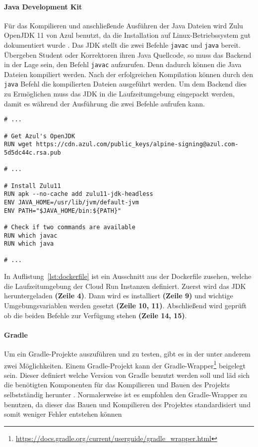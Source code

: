 \paragraph{Java Development Kit} Für das Kompilieren und anschließende Ausführen der Java Dateien wird
Zulu OpenJDK 11 von Azul benutzt, da die Installation auf
Linux-Betriebssystem gut dokumentiert wurde \cite{AzulZuluJDK}.
Das JDK stellt die zwei Befehle \texttt{javac} und \texttt{java} bereit.
Übergeben Student oder Korrektoren ihren Java Quellcode, so muss das Backend in der Lage
sein, den Befehl \texttt{javac} aufzurufen. Denn dadurch können die Java Dateien kompiliert werden.
Nach der erfolgreichen Kompilation können durch den \texttt{java} Befehl die kompilierten Dateien
ausgeführt werden.
Um dem Backend dies zu Ermöglichen muss das JDK in die Laufzeitumgebung eingepackt werden,
damit es während der Ausführung die zwei Befehle aufrufen kann.\\

\begin{lstlisting}[caption={Ausschnitt aus der Dockerfile mit JDK}, label={lst:dockerfile}]
# ... 

# Get Azul's OpenJDK
RUN wget https://cdn.azul.com/public_keys/alpine-signing@azul.com-5d5dc44c.rsa.pub

# ...

# Install Zulu11
RUN apk --no-cache add zulu11-jdk-headless
ENV JAVA_HOME=/usr/lib/jvm/default-jvm
ENV PATH="$JAVA_HOME/bin:${PATH}"

# Check if two commands are available
RUN which javac
RUN which java

# ...
\end{lstlisting}

In Auflistung~\ref{lst:dockerfile} ist ein Ausschnitt
aus der Dockerfile zusehen, welche die Laufzeitumgebung
der Cloud Run Instanzen definiert. Zuerst wird das JDK
heruntergeladen \textbf{(Zeile 4)}. Dann wird es
installiert \textbf{(Zeile 9)} und wichtige Umgebungsvariablen
werden gesetzt \textbf{(Zeile 10, 11)}.
Abschließend wird geprüft ob die beiden Befehle
zur Verfügung stehen \textbf{(Zeile 14, 15)}.

\paragraph{Gradle} Um ein Gradle-Projekte auszuführen und zu testen,
gibt es in der unter anderem zwei Möglichkeiten. Einem Gradle-Projekt
kann der Gradle-Wrapper\footnote{\url{https://docs.gradle.org/current/userguide/gradle_wrapper.html}}
beigelegt sein. Dieser definiert welche Version von Gradle benutzt
werden soll und läd sich die benötigten Komponenten für das Kompilieren
und Bauen des Projekts selbstständig herunter \cite{GradleWrapper}.
Normalerweise ist es empfohlen den Gradle-Wrapper zu benutzen,
da dieser das Bauen und Kompilieren des Projektes standardisiert und
somit weniger Fehler entstehen können \cite{GradleWrapper}


